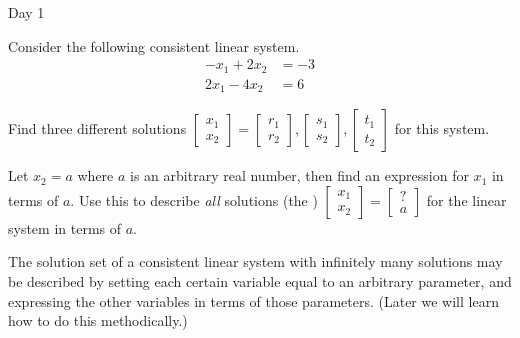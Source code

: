 \begin{applicationActivities}{Day 1}
\begin{activity}{10}
  Consider the following consistent linear system.
  \begin{align*}
  -x_1+2x_2  &= -3 \\
  2x_1-4x_2  &=  6
  \end{align*}
\begin{subactivity}
  Find three different solutions
  \(
    \begin{bmatrix}
      x_1 \\
      x_2
    \end{bmatrix}=
    \begin{bmatrix}
      r_1 \\
      r_2
    \end{bmatrix},
    \begin{bmatrix}
      s_1 \\
      s_2
    \end{bmatrix},
    \begin{bmatrix}
      t_1 \\
      t_2
    \end{bmatrix}
  \)
  for this system.
\end{subactivity}
\begin{subactivity}
  Let \(x_2=a\) where \(a\) is an arbitrary real number, then find an
  expression for \(x_1\) in terms of \(a\). Use this to describe \textit{all}
  solutions (the )
  \(
    \begin{bmatrix}
      x_1 \\
      x_2
    \end{bmatrix}=
    \begin{bmatrix}
      ? \\
      a
    \end{bmatrix}
  \)
  for the linear system in terms of \(a\).
\end{subactivity}
\end{activity}

\begin{remark}
  The solution set of a consistent linear system with infinitely many solutions
  may be described by setting each
  certain variable equal to an arbitrary parameter, and expressing the
  other variables in terms of those parameters. (Later we will learn
  how to do this methodically.)
\end{remark}


\end{applicationActivities}
